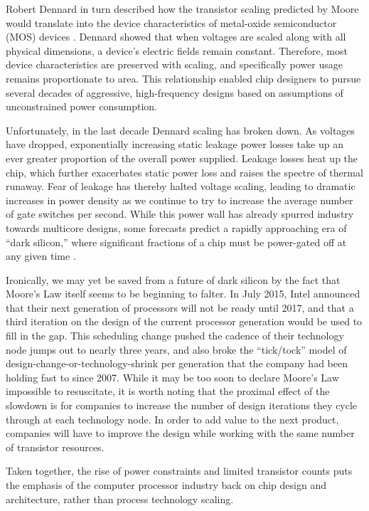 Robert Dennard in turn described how the transistor scaling predicted by Moore would translate into the device characteristics of metal-oxide semiconductor (MOS) devices \cite{dennard1974design}.
Dennard showed that when voltages are scaled along with all physical dimensions, a device's electric fields remain constant.
Therefore, most device characteristics are preserved with scaling, and specifically power usage remains proportionate to area.
This relationship enabled chip designers to pursue several decades of aggressive, high-frequency designs based on assumptions of unconstrained power consumption.

Unfortunately, in the last decade Dennard scaling has broken down.
As voltages have dropped, exponentially increasing static leakage power losses take up an ever greater proportion of the overall power supplied.
Leakage losses heat up the chip, which further exacerbates static power loss and raises the spectre of thermal runaway.
Fear of leakage has thereby halted voltage scaling, leading to dramatic increases in power density as we continue to try to increase the average number of gate switches per second. 
While this power wall has already spurred industry towards multicore designs, some forecasts predict a rapidly approaching era of ``dark silicon,'' where significant fractions of a chip must be power-gated off at any given time \cite{esmaeilzadeh2011dark}.

Ironically, we may yet be saved from a future of dark silicon by the fact that Moore's Law itself seems to be beginning to falter.
In July 2015, Intel announced that their next generation of processors will not be ready until 2017,
and that a third iteration on the design of the current processor generation would be used to fill in the gap.
This scheduling change pushed the cadence of their technology node jumps out to nearly three years,
and also broke the ``tick/tock'' model of design-change-or-technology-shrink per generation that the company had been holding fast to since 2007.
While it may be too soon to declare Moore's Law impossible to resuscitate, it is worth noting that the proximal effect of the slowdown is for companies to increase the number of design iterations they cycle through at each technology node.
In order to add value to the next product, companies will have to improve the design while working with the same number of transistor resources.

Taken together, the rise of power constraints and limited transistor counts puts the emphasis of the computer processor industry back on chip design and architecture, rather than process technology scaling.

